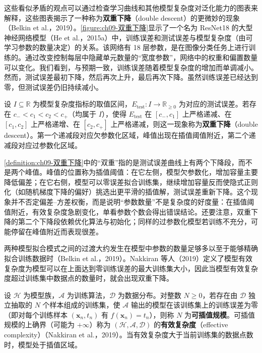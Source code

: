 \documentclass[../../main.tex]{subfiles}
\begin{document}
这些看似矛盾的观点可以通过检查学习曲线和其他模型复杂度对泛化能力的图表来解释，这些图表揭示了一种称为\textbf{双重下降}（double descent）的更微妙的现象（Belkin et al.，2019）。\cref{figure:ch09-双重下降}显示了一个名为 ResNet18 的大型神经网络模型（He et al.，2015a）中，训练误差和测试误差与模型复杂度（由可学习参数的数量决定）的关系。该网络有 18 层参数，是在图像分类任务上进行训练的。通过改变控制每层中隐藏单元数量的“宽度参数”，网络中的权重和偏置数量可以变化。我们看到，与预期一致，训练误差随着模型复杂度的增加而单调减小。然而，测试误差最初下降，然后再次上升，最后再次下降。虽然训练误差已经达到零，但测试误差仍旧持续减小。

\begin{definition}[双重下降]\label{definition:ch09-双重下降}
设 $I\subseteq\mathbb{R}$ 为模型复杂度指标的取值区间，$E_{\mathrm{test}}:I\to\mathbb{R}_{\geqslant0}$ 为对应的测试误差。若存在 $c_{-}<c_{1}<c_{2}<c_{+}$（均属于 $I$），使得 $E_{\mathrm{test}}$ 在 $[c_{-},c_{1}]$ 上严格递减、在 $[c_{1},c_{2}]$ 上严格递增、在 $[c_{2},c_{+}]$ 上严格递减，则这一现象称为\textbf{双重下降}（double descent）。第一个递减段对应欠参数化区域，峰值出现在插值阈值附近，第二个递减段对应过参数化区域。
\end{definition}

\begin{remark}\cref{definition:ch09-双重下降}中的“双重”指的是测试误差曲线上有两个下降段，而不是两个峰值。峰值的位置称为插值阈值：在它左侧，模型欠参数化，增加容量主要降低偏差；在它右侧，模型可以零误差拟合训练集，继续增加容量反而使隐式正则化（如随机梯度下降的偏好）挑选出更平滑的插值解，测试误差重新下降。这个现象并不否定偏差--方差权衡，而是说明“参数数量”不是复杂度的好度量：在插值阈值附近，有效复杂度急剧变化，单看参数个数会得出错误结论。还要注意，双重下降的第二个下降段依赖优化算法与初始化；同样的过参数化模型若训练不充分，可能停留在峰值附近而表现很差。
\end{remark}

两种模型拟合模式之间的过渡大约发生在模型中参数的数量足够多以至于能够精确拟合训练数据时（Belkin et al.，2019）。Nakkiran 等人（2019）定义了模型有效复杂度为模型可以在上面达到零训练误差的最大训练集大小，因此当模型有效复杂度超过训练集中数据点的数量时，就会出现双重下降。

\begin{definition}[模型有效复杂度]\label{definition:ch09-模型有效复杂度}
设 $\mathcal{H}$ 为模型族，$\mathcal{A}$ 为训练算法，$\mathcal{D}$ 为数据分布。对整数 $N\geqslant0$，若存在由 $\mathcal{D}$ 独立抽取的 $N$ 个样本组成的训练集，使 $\mathcal{A}$ 输出的模型在该训练集上的训练误差为零（即对每个训练样本 $(\boldsymbol{x}_{n},t_{n})$ 有 $f(\boldsymbol{x}_{n})=t_{n}$），则称 $N$ 为\textbf{可插值规模}。可插值规模的上确界（可能为 $+\infty$）称为 $(\mathcal{H},\mathcal{A},\mathcal{D})$ 的\textbf{有效复杂度}（effective complexity）（Nakkiran et al.，2019）。当有效复杂度大于当前训练集的数据点数时，模型处于插值区域。
\end{definition}
\end{document}
